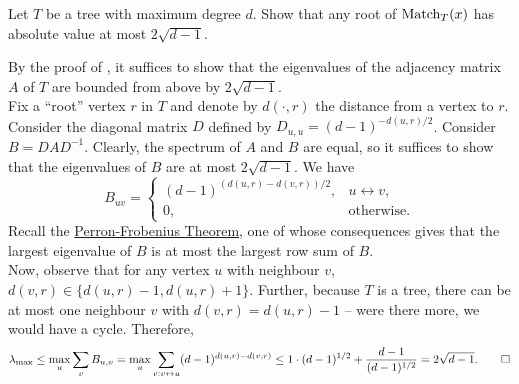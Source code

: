 	\begin{problem}
		Let $T$ be a tree with maximum degree $d$. Show that any root of $\operatorname{Match}_T(x)$ has absolute value at most $2\sqrt{d-1}$.
	\end{problem}
	\begin{solution*}

		By the proof of , it suffices to show that the eigenvalues of the adjacency matrix $A$ of $T$ are bounded from above by $2\sqrt{d-1}$.\\
		Fix a ``root'' vertex $r$ in $T$ and denote by $d(\cdot,r)$ the distance from a vertex to $r$. Consider the diagonal matrix $D$ defined by $D_{u,u} = (d-1)^{-d(u,r)/2}$. Consider $B = DAD^{-1}$. Clearly, the spectrum of $A$ and $B$ are equal, so it suffices to show that the eigenvalues of $B$ are at most $2\sqrt{d-1}$. We have
		\[ B_{uv} = \begin{cases} (d-1)^{(d(u,r)-d(v,r))/2}, & u \leftrightarrow v, \\ 0, & \text{otherwise.} \end{cases} \]
		Recall the \href{https://en.wikipedia.org/wiki/Perron%E2%80%93Frobenius_theorem#Perron%E2%80%93Frobenius_theorem_for_irreducible_non-negative_matrices}{Perron-Frobenius Theorem}, one of whose consequences gives that the largest eigenvalue of $B$ is at most the largest row sum of $B$.\\
		Now, observe that for any vertex $u$ with neighbour $v$, $d(v,r) \in \{d(u,r)-1,d(u,r)+1\}$. Further, because $T$ is a tree, there can be at most one neighbour $v$ with $d(v,r) = d(u,r)-1$ -- were there more, we would have a cycle. Therefore,
		\[ \lambda_\text{max} \le \max_u \sum_v B_{u,v} = \max_u \sum_{v : v \leftrightarrow u} (d-1)^{d(u,r)-d(v,r)} \le 1 \cdot (d-1)^{1/2} + \frac{d-1}{(d-1)^{1/2}} = 2\sqrt{d-1}. \qedhere \]
	\end{solution*}


